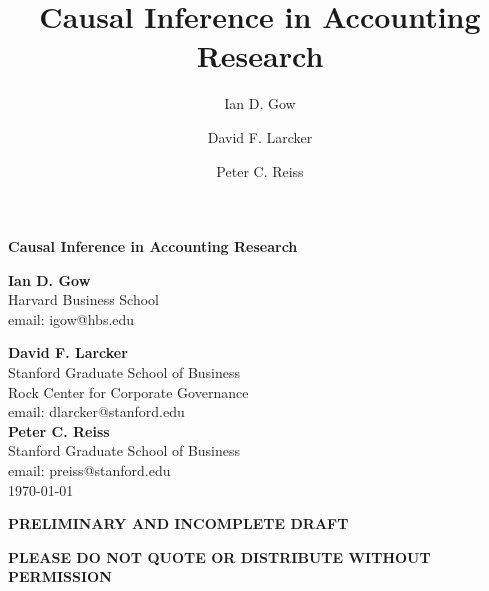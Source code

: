 \documentclass[11pt,reqno,titlepage]{amsart}
\title[Causal Inference in Accounting]{Causal Inference in Accounting Research}
\author{Ian D. Gow}
\author{David F. Larcker}
\author{Peter C. Reiss}
\begin{document}
\usetikzlibrary{automata, shapes, calc, positioning}



\begin{titlepage}
  \centering
  	\begin{large}
  	\textbf{Causal Inference in Accounting Research} \\	
  	\end{large}
  	\vspace{60pt}
	\textbf{Ian D. Gow} \\
	Harvard Business School \\
	email: igow@hbs.edu

  	\vspace{30pt}
	\textbf{David F. Larcker} \\
	Stanford Graduate School of Business \\
	Rock Center for Corporate Governance \\
	email: dlarcker@stanford.edu \\
		
	\vspace{30pt}
	\textbf{Peter C. Reiss} \\
	Stanford Graduate School of Business \\
	email: preiss@stanford.edu \\

	\vspace{30pt}
	\today
	
	\vspace{30pt}
	\centerline{\bf PRELIMINARY AND INCOMPLETE DRAFT}
	\centerline{\bf PLEASE DO NOT QUOTE OR DISTRIBUTE WITHOUT PERMISSION}
	
\end{titlepage}
\end{document}
